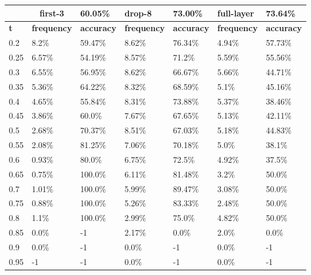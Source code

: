 
\begin{table}[t]
\centering
\begin{tabular}{lllllll}
\hline
\multicolumn{1}{c}{} & \multicolumn{1}{c}{first-3} & \multicolumn{1}{l|}{60.05\%} & drop-8 & \multicolumn{1}{l|}{73.00\%} & full-layer & 73.64\% \\ \hline
\multicolumn{1}{l|}{\textbf{t}} & \textbf{frequency} & \multicolumn{1}{l|}{\textbf{accuracy}} & \textbf{frequency} & \multicolumn{1}{l|}{\textbf{accuracy}} & \textbf{frequency} & \textbf{accuracy} \\ \hline	\multicolumn{1}{l|}{0.2}&  8.2\% & \multicolumn{1}{l|}{59.47\%}& 8.62\% & \multicolumn{1}{l|}{76.34\%}& 4.94\% & 57.73\%\\ 
\multicolumn{1}{l|}{0.25}&  6.57\% & \multicolumn{1}{l|}{54.19\%}& 8.57\% & \multicolumn{1}{l|}{71.2\%}& 5.59\% & 55.56\%\\ 
\multicolumn{1}{l|}{0.3}&  6.55\% & \multicolumn{1}{l|}{56.95\%}& 8.62\% & \multicolumn{1}{l|}{66.67\%}& 5.66\% & 44.71\%\\ 
\multicolumn{1}{l|}{0.35}&  5.36\% & \multicolumn{1}{l|}{64.22\%}& 8.32\% & \multicolumn{1}{l|}{68.59\%}& 5.1\% & 45.16\%\\ 
\multicolumn{1}{l|}{0.4}&  4.65\% & \multicolumn{1}{l|}{55.84\%}& 8.31\% & \multicolumn{1}{l|}{73.88\%}& 5.37\% & 38.46\%\\ 
\multicolumn{1}{l|}{0.45}&  3.86\% & \multicolumn{1}{l|}{60.0\%}& 7.67\% & \multicolumn{1}{l|}{67.65\%}& 5.13\% & 42.11\%\\ 
\multicolumn{1}{l|}{0.5}&  2.68\% & \multicolumn{1}{l|}{70.37\%}& 8.51\% & \multicolumn{1}{l|}{67.03\%}& 5.18\% & 44.83\%\\ 
\multicolumn{1}{l|}{0.55}&  2.08\% & \multicolumn{1}{l|}{81.25\%}& 7.06\% & \multicolumn{1}{l|}{70.18\%}& 5.0\% & 38.1\%\\ 
\multicolumn{1}{l|}{0.6}&  0.93\% & \multicolumn{1}{l|}{80.0\%}& 6.75\% & \multicolumn{1}{l|}{72.5\%}& 4.92\% & 37.5\%\\ 
\multicolumn{1}{l|}{0.65}&  0.75\% & \multicolumn{1}{l|}{100.0\%}& 6.11\% & \multicolumn{1}{l|}{81.48\%}& 3.2\% & 50.0\%\\ 
\multicolumn{1}{l|}{0.7}&  1.01\% & \multicolumn{1}{l|}{100.0\%}& 5.99\% & \multicolumn{1}{l|}{89.47\%}& 3.08\% & 50.0\%\\ 
\multicolumn{1}{l|}{0.75}&  0.88\% & \multicolumn{1}{l|}{100.0\%}& 5.26\% & \multicolumn{1}{l|}{83.33\%}& 2.48\% & 50.0\%\\ 
\multicolumn{1}{l|}{0.8}&  1.1\% & \multicolumn{1}{l|}{100.0\%}& 2.99\% & \multicolumn{1}{l|}{75.0\%}& 4.82\% & 50.0\%\\ 
\multicolumn{1}{l|}{0.85}&  0.0\% & \multicolumn{1}{l|}{-1}& 2.17\% & \multicolumn{1}{l|}{0.0\%}& 2.0\% & 0.0\%\\ 
\multicolumn{1}{l|}{0.9}&  0.0\% & \multicolumn{1}{l|}{-1}& 0.0\% & \multicolumn{1}{l|}{-1}& 0.0\% & -1\\ 
\multicolumn{1}{l|}{0.95}&  -1 & \multicolumn{1}{l|}{-1}& 0.0\% & \multicolumn{1}{l|}{-1}& 0.0\% & -1\\ 


\end{tabular}
\end{table}

